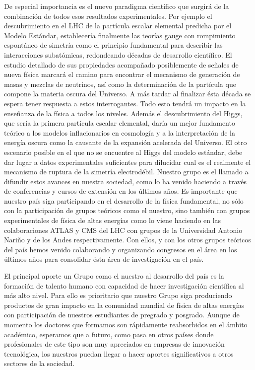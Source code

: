 De especial importancia es el nuevo paradigma científico que surgirá
de la combinación de todos esos resultados experimentales. Por ejemplo
el descubrimiento en el LHC de la partícula escalar elemental predicha
por el Modelo Estándar, establecería finalmente las teorías gauge con
rompimiento espontáneo de simetría como el principio fundamental para
describir las interacciones subatómicas, redondeando décadas de
desarrollo científico.  El estudio detallado de sus propiedades
acompañado posiblemente de señales de nueva física marcará el camino
para encontrar el mecanismo de generación de masas y mezclas de
neutrinos, así como la determinación de la partícula que compone la
materia oscura del Universo. A más tardar al finalizar ésta década se
espera tener respuesta a estos interrogantes. Todo esto tendrá un
impacto en la enseñanza de la física a todos los niveles. Además el
descubrimiento del Higgs, que sería la primera partícula escalar
elemental, daría un mejor fundamento teórico a los modelos
inflacionarios en cosmología y a la interpretación de la energía
oscura como la causante de la expansión acelerada del Universo. El
otro escenario posible en el que no se encuentre al Higgs del modelo
estándar, debe dar lugar a datos experimentales suficientes para
dilucidar cual es el realmente el mecanismo de ruptura de la simetría
electrodébil. Nuestro grupo es el llamado a difundir estos avances en
nuestra sociedad, como lo ha venido haciendo a través de conferencias
y cursos de extensión en los últimos años. Es importante que nuestro
país siga participando en el desarrollo de la física fundamental, no
sólo con la participación de grupos teóricos como el nuestro, sino
también con grupos experimentales de física de altas energías como lo
viene haciendo en las colaboraciones ATLAS y CMS del LHC con grupos de
la Universidad Antonio Nariño y de los Andes respectivamente. Con
ellos, y con los otros grupos teóricos del país hemos venido
colaborando y organizando congresos en el área en los últimos años
para consolidar ésta área de investigación en el país.

El principal aporte un Grupo como el nuestro al desarrollo del país es
la formación de talento humano con capacidad de hacer investigación
científica al más alto nivel. Para ello es prioritario que nuestro
Grupo siga produciendo productos de gran impacto en la comunidad
mundial de física de altas energías con participación de nuestros
estudiantes de pregrado y posgrado.  Aunque de momento los doctores
que formamos son rápidamente reabsorbidos en el ámbito académico, 
esperamos que a futuro, como pasa en otros países donde profesionales
de este tipo son muy apreciados en empresas de innovación tecnológica,
los nuestros puedan llegar a hacer aportes significativos a otros
sectores de la sociedad.


